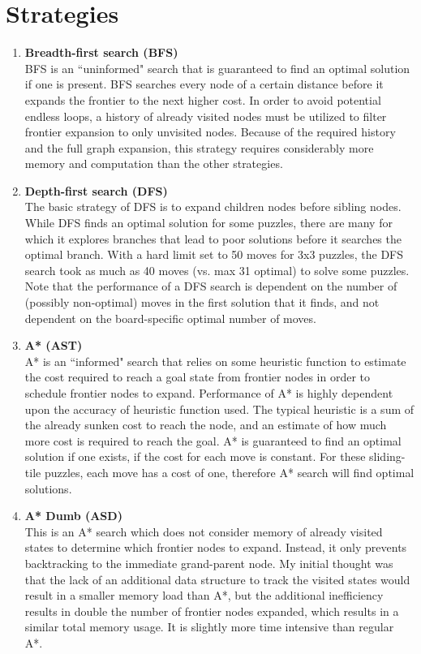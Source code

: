 \documentclass{article}
\newcommand\bitem[1]{\item{\bfseries #1}\\}
\begin{document}
	\section{Strategies}
	\begin{enumerate}
		\bitem{Breadth-first search (BFS)}
		    BFS is an ``uninformed" search that is guaranteed to find an optimal solution if one is present.  BFS searches every node of a certain distance before it expands the frontier to the next higher cost.  In order to avoid potential endless loops, a history of already visited nodes must be utilized to filter frontier expansion to only unvisited nodes.  Because of the required history and the full graph expansion, this strategy requires considerably more memory and computation than the other strategies.
		\bitem{Depth-first search (DFS)}
		    The basic strategy of DFS is to expand children nodes before sibling nodes.  
		    While DFS finds an optimal solution for some puzzles, there are many for which it explores branches that lead to poor solutions before it searches the optimal branch.  With a hard limit set to 50 moves for 3x3 puzzles, the DFS search took as much as 40 moves (vs. max 31 optimal) to solve some puzzles. 
		    Note that the performance of a DFS search is dependent on the number of (possibly non-optimal) moves in the first solution that it finds, and not dependent on the board-specific optimal number of moves. 
		\bitem{A* (AST)}
		    A* is an ``informed" search that relies on some heuristic function to estimate the cost required to reach a goal state from frontier nodes in order to schedule frontier nodes to expand.  Performance of A* is highly dependent upon the accuracy of heuristic function used.  The typical heuristic is a sum of the already sunken cost to reach the node, and an estimate of how much more cost is required to reach the goal.  A* is guaranteed to find an optimal solution if one exists, if the cost for each move is constant.  For these sliding-tile puzzles, each move has a cost of one, therefore A* search will find optimal solutions.
		\bitem{A* Dumb (ASD)}
		    This is an A* search which does not consider memory of already visited states to determine which frontier nodes to expand.  Instead, it only prevents backtracking to the immediate grand-parent node.  My initial thought was that the lack of an additional data structure to track the visited states would result in a smaller memory load than A*, but the additional inefficiency results in double the number of frontier nodes expanded, which results in a similar total memory usage.  It is slightly more time intensive than regular A*.

\end{enumerate}
\end{document}
